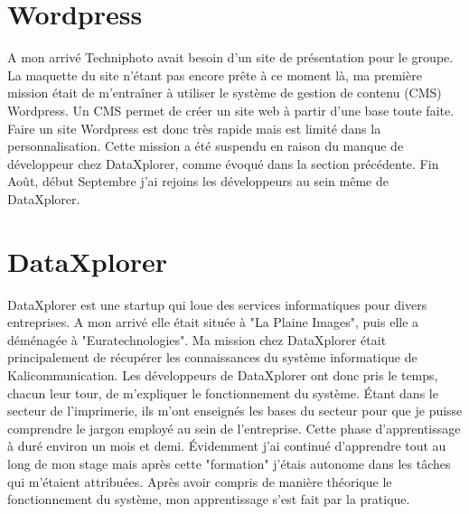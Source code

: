 
\section{Wordpress}
A mon arrivé Techniphoto avait besoin d'un site de présentation pour le groupe. La maquette du site n'étant pas encore prête à ce moment là, ma première mission était de m'entraîner à utiliser le système de gestion de contenu (CMS) Wordpress. Un CMS permet de créer un site web à partir d'une base toute faite. Faire un site Wordpress est donc très rapide mais est limité dans la personnalisation.\newline
Cette mission a été suspendu en raison du manque de développeur chez DataXplorer, comme évoqué dans la section précédente. Fin Août, début Septembre j'ai rejoins les développeurs au sein même de DataXplorer.

\section{DataXplorer}
DataXplorer est une startup qui loue des services informatiques pour divers entreprises. A mon arrivé elle était située à "La Plaine Images", puis elle a déménagée à "Euratechnologies". Ma mission chez DataXplorer était principalement de récupérer les connaissances du système informatique de Kalicommunication. Les développeurs de DataXplorer ont donc pris le temps, chacun leur tour, de m'expliquer le fonctionnement du système. Étant dans le secteur de l'imprimerie, ils m'ont enseignés les bases du secteur pour que je puisse comprendre le jargon employé au sein de l'entreprise. Cette phase d'apprentissage à duré environ un mois et demi. Évidemment j'ai continué d'apprendre tout au long de mon stage mais après cette "formation" j'étais autonome dans les tâches qui m'étaient attribuées.\newline
Après avoir compris de manière théorique le fonctionnement du système, mon apprentissage s'est fait par la pratique.